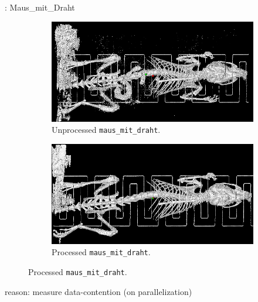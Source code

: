 \documentclass{beamer}
\begin{document}
\begin{frame}{\insertsubsection: Maus\_mit\_Draht}
\begin{figure}
\centering
\begin{subfigure}{.5\textwidth}
  \centering
  \includegraphics[width=.9\linewidth]{images/maus_mit_draht_unprocessed.png}
  \caption{Unprocessed \texttt{maus\_mit\_draht}.}
\end{subfigure}%
\begin{subfigure}{.5\textwidth}
  \centering
  \includegraphics[width=.9\linewidth]{images/maus_mit_draht_processed.png}
  \caption{Processed \texttt{maus\_mit\_draht}.}
\end{subfigure}
\end{figure}
  reason: measure data-contention (on parallelization) 
\end{frame}
\end{document}
